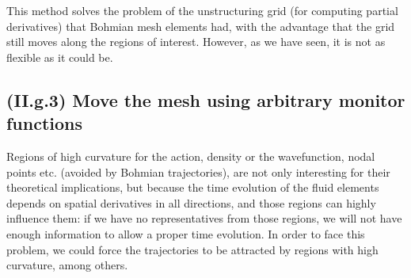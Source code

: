 \documentclass[11pt, a4paper]{article} %
\begin{document}
This method solves the problem of the unstructuring grid (for computing partial derivatives) that Bohmian mesh elements had, with the advantage that the grid still moves along the regions of interest. However, as we have seen, it is not as flexible as it could be.\vspace{-0.1cm}

\subsection*{\bf (II.g.3) Move the mesh using arbitrary monitor functions \vspace{-0.05cm}} 
Regions of high curvature for the action, density or the wavefunction, nodal points etc. (avoided by Bohmian trajectories), are not only interesting for their theoretical implications, but because the time evolution of the fluid elements depends on spatial derivatives in all directions, and those regions can highly influence them: if we have no representatives from those regions, we will not have enough information to allow a proper time evolution. In order to face this problem, we could force the trajectories to be attracted by regions with high curvature, among others.\vspace{-0.2cm}
\end{document}
